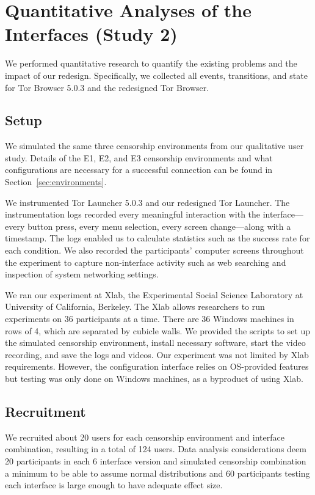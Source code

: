 \documentclass[USenglish,oneside,twocolumn]{article}
\begin{document}
\section{Quantitative Analyses of the Interfaces (Study 2)}
\label{sec:quantitative}
We performed quantitative research to quantify the existing problems
and the impact of our redesign. Specifically, we collected all events, transitions, 
and state for Tor Browser 5.0.3 and the redesigned Tor Browser.

\subsection{Setup}
We simulated the same three censorship environments from 
our qualitative user study. Details of the E1, E2, and E3
censorship environments and what configurations are necessary for a 
successful connection can be found in Section~\ref{sec:environments}.

We instrumented Tor Launcher 5.0.3 and our redesigned Tor Launcher.
The instrumentation logs recorded every meaningful interaction with the interface---every
button press, every menu selection, every screen change---along with a timestamp.
The logs enabled us to calculate statistics such as the success rate
for each condition. We also recorded the participants' computer screens 
throughout the experiment to capture non-interface activity such as 
web searching and inspection of system networking settings.

We ran our experiment at Xlab, the Experimental Social Science Laboratory at University of 
California, Berkeley. The Xlab allows researchers to run experiments on 36 participants at a time.
There are 36 Windows machines in rows of 4, which are separated by cubicle walls. 
We provided the scripts to set up the simulated censorship environment, install necessary software, 
start the video recording, and save the logs and videos. Our experiment was not limited by Xlab
requirements. However, the configuration interface relies on OS-provided features but testing 
was only done on Windows machines, as a byproduct of using Xlab. 

\subsection{Recruitment}
We recruited about 20 users for each censorship environment
and interface combination, resulting in a total of 124 users. 
Data analysis considerations deem 20 participants in each 
6 interface version and simulated censorship combination a 
minimum to be able to assume normal distributions and 60 participants
testing each interface is large enough to have adequate effect size.
\end{document}
